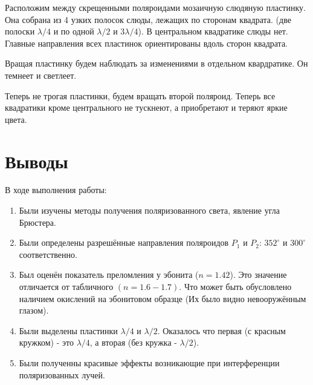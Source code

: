 \documentclass{article}
\begin{document}
Расположим между скрещенными поляроидами мозаичную слюдяную пластинку. Она собрана из 4 узких полосок слюды, лежащих по сторонам квадрата.
(две полоски \( \lambda/4 \) и по одной \( \lambda/2 \) и \( 3\lambda/4 \)). В центральном квадратике слюды нет. Главные
направления всех пластинок ориентированы вдоль сторон квадрата.

Вращая пластинку будем наблюдать за изменениями в отдельном квардратике. Он темнеет и светлеет.

Теперь не трогая пластинки, будем вращать второй поляроид. Теперь все квадратики кроме центрального не тускнеют, а приобретают
и теряют яркие цвета.

\section{Выводы}

В ходе выполнения работы:
\begin{enumerate}
    \item Были изучены методы получения поляризованного света, явление угла Брюстера.
    \item Были определены разрешённые направления поляроидов \(P_1\) и \(P_2\): \(352^\circ\) и \(300^\circ\) соответственно.
    \item Был оценён показатель преломления у эбонита (\(n = 1.42\)). Это значение отличается от табличного \(\left( n = 1.6 - 1.7 \right)\). 
Что может быть обусловлено наличием окислений на эбонитовом образце (Их было видно невооружённым глазом).
    \item Были выделены пластинки \( \lambda/4 \) и \( \lambda/2 \). Оказалось что первая (с красным кружком) - это \( \lambda/4 \), а вторая (без кружка - \( \lambda/2 \)).
    \item Были полученны красивые эффекты возникающие при интерференции поляризованных лучей.
\end{enumerate}
\end{document}
